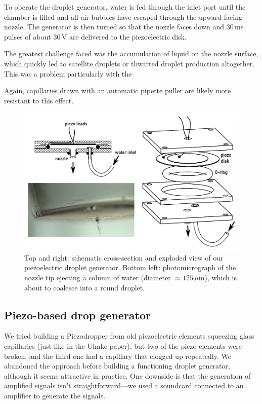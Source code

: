 \documentclass[11.5pt,oneside]{book}
\begin{document}
To operate the droplet generator, water is fed through
the inlet port until the chamber is filled and all air bubbles have escaped
through the upward-facing nozzle. The generator is then turned so that the nozzle
faces down and $30\,$ms pulses of about $30\,$V are delivered to the
piezoelectric disk.

The greatest challenge faced was the accumulation of liquid on the nozzle
surface, which quickly led to satellite droplets or thwarted droplet production
altogether. This was a problem particularly with the 

Again, capillaries drawn with an automatic pipette puller are likely
more resistant to this effect.

\begin{figure}
\centering
\includegraphics[width=\textwidth]{img/setup/flatyang_exploded.pdf}
\caption{Top and right: schematic cross-section and exploded view of our
    piezoelectric droplet generator. Bottom left: photomicrograph of the nozzle
    tip ejecting a column of water (diameter $\approx 125\,\mu$m), which is about to coalesce into a
round droplet. \label{fig:flatyang}}
\end{figure}

\subsection{Piezo-based drop generator}
We tried building a Piezodropper from old piezoelectric elements squeezing glass
capillaries (just like in the Ulmke paper), but two of the piezo elements were
broken, and the third one had a capillary that clogged up repeatedly. We
abandoned the approach before building a functioning droplet generator, although
it seems attractive in practice. One downside is that the generation of
amplified signals isn't straightforward---we used a soundcard connected to an
amplifier to generate the signals.
\end{document}
